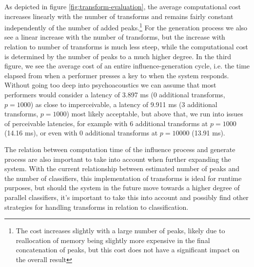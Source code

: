 	As depicted in figure \ref{fig:transform-evaluation}, the average computational cost increases linearly with the number of transforms and remains fairly constant independently of the number of added peaks.\footnote{The cost increases slightly with a large number of peaks, likely due to reallocation of memory being slightly more expensive in the final concatenation of peaks, but this cost does not have a significant impact on the overall result} For the generation process we also see a linear increase with the number of transforms, but the increase with relation to number of transforms is much less steep, while the computational cost is determined by the number of peaks to a much higher degree. In the third figure, we see the average cost of an entire influence-generation cycle, i.e. the time elapsed from when a performer presses a key to when the system responds. Without going too deep into psychoacoustics we can assume that most performers would consider a latency of 3.897 ms (0 additional transforms, $p = 1000$) as close to imperceivable, a latency of 9.911 ms (3 additional transforms, $p=1000$) most likely acceptable, but above that, we run into issues of perceivable latencies, for example with 6 additional transforms at $p=1000$  (14.16 ms), or even with 0 additional transforms at $p=10000$ (13.91 ms).
	
	The relation between computation time of the influence process and generate process are also important to take into account when further expanding the system. With the current relationship between estimated number of peaks and the number of classifiers, this implementation of transforms is ideal for runtime purposes, but should the system in the future move towards a higher degree of parallel classifiers, it's important to take this into account and possibly find other strategies for handling transforms in relation to classification.
	
	
%
%

	





